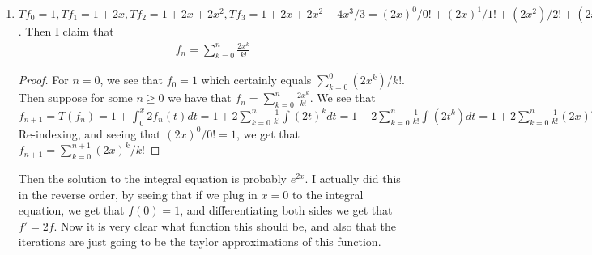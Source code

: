 \documentclass[12pt]{article}
\theoremstyle{definition}
\theoremstyle{remark}
\begin{document}
\begin{enumerate}[leftmargin=\labelsep]
	 \item 
	 $Tf_0 = 1, Tf_1 = 1 + 2x, Tf_2 = 1+2x+2x^2, Tf_3 = 1+2x+2x^2+4x^3/3 = (2x)^0/0! + (2x)^1/1! + (2x^2)/2! + (2x^3)/3!$. Then I claim that 
	 \begin{align}
		 	f_n = \sum_{k=0}^{n} \frac{2x^k}{k!}
	 \end{align}
	 \begin{proof}
		 	For $n = 0$, we see that $f_0 = 1$ which certainly equals $\sum_{k=0}^{0} (2x^k)/k!$. Then suppose for some $n \geq 0$ we have that $f_n = \sum_{k=0}^{n} \frac{2x^k}{k!}$. We see that $f_{n+1} = T(f_n) = 1 + \int_{0}^{x} 2f_n(t)dt = 1+2\sum_{k=0}^{n} \frac1{k!} \int (2t)^kdt = 1+2\sum_{k=0}^{n} \frac1{k!} \int (2t^k)dt = 1 + 2\sum_{k=0}^{n} \frac1{k!} (2x)^{k+1}/(2(k+1)) = 1 + \sum_{k=0}^{n} (2x)^{k+1}/(k+1)!$ Re-indexing, and seeing that $(2x)^0/0!=1$, we get that $f_{n+1} = \sum_{k=0}^{n+1} (2x)^k/k!$ 
	 \end{proof}
	 Then the solution to the integral equation is probably $e^{2x}$. I actually did this in the reverse order, by seeing that if we plug in $x = 0$ to the integral equation, we get that $f(0)=1$, and differentiating both sides we get that $f' = 2f$. Now it is very clear what function this should be, and also that the iterations are just going to be the taylor approximations of this function.
		\end{enumerate}
	
	
\end{document}
